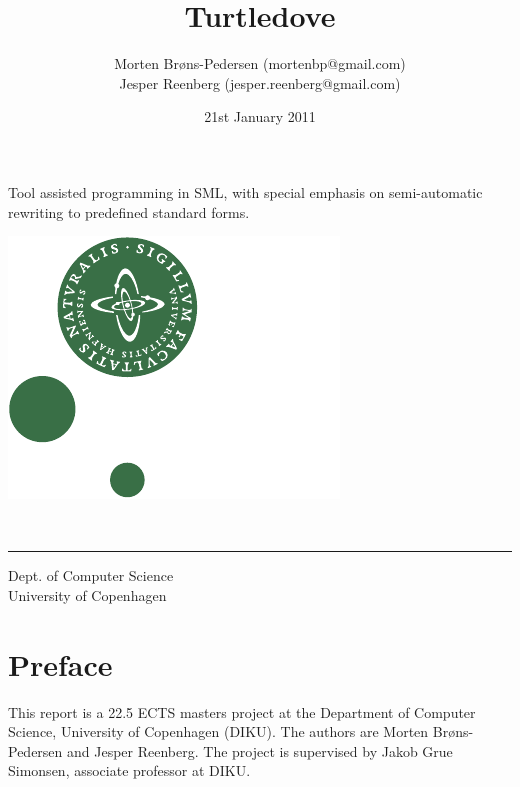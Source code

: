 \documentclass[a4paper, oneside, final]{memoir}
\title{Turtledove}
\author{Morten Brøns-Pedersen {\footnotesize{(mortenbp@gmail.com)}}\\  
Jesper Reenberg \footnotesize{(jesper.reenberg@gmail.com)}}
\date{21st January 2011} %
\makeatletter
\theoremstyle{definition}
\def\maketitle{%
  \null
  \thispagestyle{empty}%
  \vfill
  \begin{center}\leavevmode
    \normalfont
    \Huge{\raggedleft \@title\par}%
    \hrulefill\par
    \Large{\raggedright \subtitle\par}%
    \vskip 2cm
    {\@date\par}%
  \end{center}%
  \vfill
\begin{minipage}{80pt}
\includegraphics*[scale=0.75]{imgs/nat-logo}
\end{minipage}
\begin{minipage}{300pt}
  \begin{flushleft}
    {\large \@author } \\
    {\footnotesize \suplementInfo }

  \end{flushleft}
\end{minipage}
\cleardoublepage %
  \clearpage %
}
\def\subtitle{\footnotesize{Tool assisted programming in SML, with special emphasis on semi-automatic rewriting to
predefined standard forms.}}
\def\suplementInfo{
  \kern 5pt \hrule width 11pc \kern 5pt %
  Dept. of Computer Science \\
  University of Copenhagen}
\makeatother
\begin{document}
\frontmatter

\maketitle
\thispagestyle{empty}

\begin{abstract}

\end{abstract}

\clearpage 
\chapter*{Preface}
This report is a 22.5 ECTS masters project at the Department of Computer
Science, University of Copenhagen (DIKU). The authors are Morten Brøns-Pedersen
and Jesper Reenberg. The project is supervised by Jakob Grue Simonsen, associate
professor at DIKU.

\clearpage

\tableofcontents*

\mainmatter
























\appendix



\end{document}
